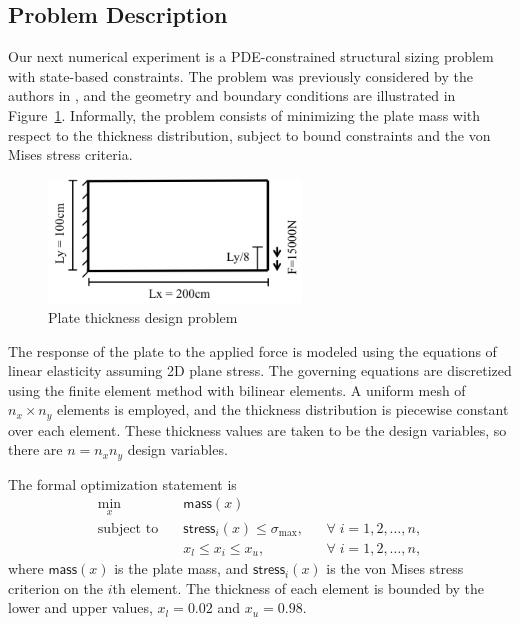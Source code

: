 \subsection{Problem Description}
Our next numerical experiment is a PDE-constrained structural sizing problem
with state-based constraints.  The problem was previously considered by the
authors in \cite{dener:scitech2016}, and the geometry and boundary conditions
are illustrated in Figure~\ref{fig:struct}.  Informally, the problem consists of
minimizing the plate mass with respect to the thickness distribution, subject
to bound constraints and the von Mises stress criteria. 
\begin{figure}[H]
  \centering
  \includegraphics[width=0.6\textwidth]{./figs/chap6_fstopo/struct.png}
  \caption{Plate thickness design problem}
  \label{fig:struct}
\end{figure}

The response of the plate to the applied force is modeled using the equations of
linear elasticity assuming 2D plane stress.  The governing equations are
discretized using the finite element method with bilinear elements.
A uniform mesh of $n_x \times n_y$ elements is employed, and the thickness
distribution is piecewise constant over each element.  These thickness values
are taken to be the design variables, so there are $n = n_x n_y$ design
variables.

The formal optimization statement is
\begin{equation*}
  \begin{alignedat}{2}
    \underset{x}{\text{min}} \quad &\textsf{mass}(x) \\  %
    \text{subject to} \quad &\textsf{stress}_i(x) \leq \sigma_{\max}, &
    &\forall\; i = 1,2,\ldots,n, \\
      & x_l \leq x_i \leq  x_u, \qquad & &\forall\; i = 1,2,\ldots,n,
  \end{alignedat}
\end{equation*}
where $\textsf{mass}(x)$ is the plate mass, and $\textsf{stress}_{i}(x)$ is the
von Mises stress criterion on the $i$th element. The thickness of each element
is bounded by the lower and upper values, $x_l = 0.02$ and $x_u = 0.98$. 

